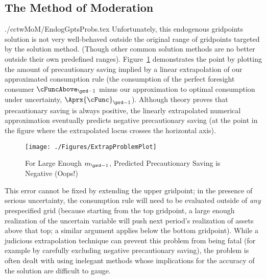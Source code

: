 \documentclass[\econtexRoot/SolvingMicroDSOPs]{subfiles}
\begin{document}
\hypertarget{the-method-of-moderation}{}
\subsection{The Method of Moderation}\label{sec:method-of-moderation}

\begin{verbatimwrite}{./cctwMoM/EndogGptsProbs.tex}
  Unfortunately, this endogenous gridpoints solution is not very
  well-behaved outside the original range of gridpoints targeted by
  the solution method.  (Though other common solution methods are no
  better outside their own predefined ranges).
  Figure~\ref{fig:ExtrapProblem} demonstrates the point by plotting
  the amount of precautionary saving implied by a linear extrapolation
  of our approximated consumption rule (the consumption of the perfect
  foresight consumer $\cFuncAbove_{\prd-1}$ minus our approximation to
  optimal consumption under uncertainty, $\Aprx{\cFunc}_{\prd-1}$).
  Although theory proves that precautionary saving is always positive,
  the linearly extrapolated numerical approximation eventually
  predicts negative precautionary saving (at the point in the figure
  where the extrapolated locus crosses the horizontal axis).

  \hypertarget{ExtrapProblemPlot}{}
  \begin{figure}
    \texttt{[image: ./Figures/ExtrapProblemPlot]}
    \caption{For Large Enough $m_{\prd-1}$, Predicted Precautionary Saving is Negative (Oops!)}
    \label{fig:ExtrapProblem}
  \end{figure}

  This error cannot be fixed by extending the upper gridpoint; in the presence of serious uncertainty, the consumption rule will need to be evaluated outside of \textit{any} prespecified grid (because starting from the top gridpoint, a large enough realization of the uncertain variable will push next period's realization of assets above that top; a similar argument applies below the bottom gridpoint).  While a judicious extrapolation technique can prevent this problem from being fatal (for example by carefully excluding negative precautionary saving), the problem is often dealt with using inelegant methods whose implications for the accuracy of the solution are difficult to gauge.
\end{verbatimwrite}
\unskip


\end{document}
